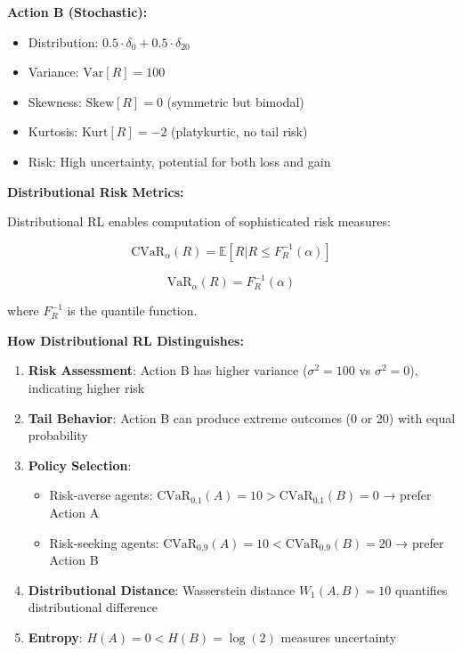 \documentclass[12pt]{article}
\begin{document}
{{\textbf{Action B (Stochastic):}
\begin{itemize}
\item Distribution: $0.5 \cdot \delta_0 + 0.5 \cdot \delta_{20}$
\item Variance: $\text{Var}[R] = 100$
\item Skewness: $\text{Skew}[R] = 0$ (symmetric but bimodal)
\item Kurtosis: $\text{Kurt}[R] = -2$ (platykurtic, no tail risk)
\item Risk: High uncertainty, potential for both loss and gain
\end{itemize}

\textbf{Distributional Risk Metrics:}

Distributional RL enables computation of sophisticated risk measures:

\begin{equation}
\text{CVaR}_\alpha(R) = \mathbb{E}[R | R \leq F_R^{-1}(\alpha)]
\end{equation}

\begin{equation}
\text{VaR}_\alpha(R) = F_R^{-1}(\alpha)
\end{equation}

where $F_R^{-1}$ is the quantile function.

\textbf{How Distributional RL Distinguishes:}
\begin{enumerate}
\item \textbf{Risk Assessment}: Action B has higher variance ($\sigma^2 = 100$ vs $\sigma^2 = 0$), indicating higher risk
\item \textbf{Tail Behavior}: Action B can produce extreme outcomes (0 or 20) with equal probability
\item \textbf{Policy Selection}: 
   \begin{itemize}
   \item Risk-averse agents: $\text{CVaR}_{0.1}(A) = 10 > \text{CVaR}_{0.1}(B) = 0$ → prefer Action A
   \item Risk-seeking agents: $\text{CVaR}_{0.9}(A) = 10 < \text{CVaR}_{0.9}(B) = 20$ → prefer Action B
   \end{itemize}
\item \textbf{Distributional Distance}: Wasserstein distance $W_1(A, B) = 10$ quantifies distributional difference
\item \textbf{Entropy}: $H(A) = 0 < H(B) = \log(2)$ measures uncertainty
\end{enumerate}

}}
\end{document}
